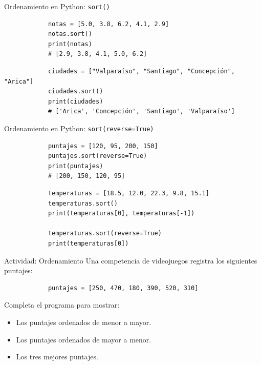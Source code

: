 \documentclass{beamer}
\begin{document}
    \begin{frame}[fragile, t]{Ordenamiento en Python: \texttt{sort()}}
        \begin{verbatim}
            notas = [5.0, 3.8, 6.2, 4.1, 2.9]
            notas.sort()
            print(notas)
            # [2.9, 3.8, 4.1, 5.0, 6.2]
        \end{verbatim}

        \vspace{0.3em}
        \begin{verbatim}
            ciudades = ["Valparaíso", "Santiago", "Concepción", "Arica"]
            ciudades.sort()
            print(ciudades)
            # ['Arica', 'Concepción', 'Santiago', 'Valparaíso']
        \end{verbatim}
    \end{frame}

    \begin{frame}[fragile, t]{Ordenamiento en Python: \texttt{sort(reverse=True)}}
        \begin{verbatim}
            puntajes = [120, 95, 200, 150]
            puntajes.sort(reverse=True)
            print(puntajes)
            # [200, 150, 120, 95]
        \end{verbatim}

        \vspace{0.3em}
        \begin{verbatim}
            temperaturas = [18.5, 12.0, 22.3, 9.8, 15.1]
            temperaturas.sort()
            print(temperaturas[0], temperaturas[-1])

            temperaturas.sort(reverse=True)
            print(temperaturas[0])
        \end{verbatim}
    \end{frame}

    \begin{frame}[fragile, t]{Actividad: Ordenamiento}
        Una competencia de videojuegos registra los siguientes puntajes:

        \begin{verbatim}
            puntajes = [250, 470, 180, 390, 520, 310]
        \end{verbatim}
        
        Completa el programa para mostrar:

        \begin{itemize}
            \item Los puntajes ordenados de menor a mayor.
            \item Los puntajes ordenados de mayor a menor.
            \item Los tres mejores puntajes.
        \end{itemize}
    \end{frame}
\end{document}
